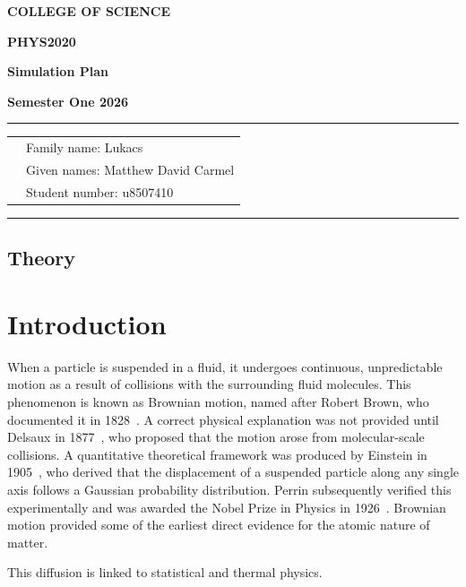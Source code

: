 \documentclass[12pt]{article}
\begin{document}
\begin{center}
    {\bf COLLEGE OF SCIENCE}
\end{center}
\centerline{\large\bf PHYS2020}       %
\vspace{0.1cm}
\centerline{\large\bf Simulation Plan}   %
\vspace{0.1cm}
\centerline{\large\bf Semester One 2026}
\vspace{3mm}
\hrule
\vspace{3mm}

\begin{tabular}{rl}
    & Family name: Lukacs \\[6pt]
    & Given names: Matthew David Carmel\\[6pt]
    & Student number: u8507410\\[6pt]
\end{tabular}

\vspace{4mm}
\hrule
\vspace{4mm}

\subsection{Theory}
\section{Introduction}

When a particle is suspended in a fluid, it undergoes continuous, unpredictable
motion as a result of collisions with the surrounding fluid molecules. This
phenomenon is known as Brownian motion, named after Robert Brown, who documented
it in 1828~\cite{brown1828}. A correct physical explanation was not provided until
Delsaux in 1877~\cite{delsaux1877}, who proposed that the motion arose from
molecular-scale collisions. A quantitative theoretical framework was produced by
Einstein in 1905~\cite{einstein1905}, who derived that the displacement of a
suspended particle along any single axis follows a Gaussian probability
distribution. Perrin subsequently verified this experimentally and was awarded the
Nobel Prize in Physics in 1926~\cite{perrin}. Brownian motion provided some of
the earliest direct evidence for the atomic nature of matter.

This diffusion is linked to statistical and thermal physics.
\end{document}

